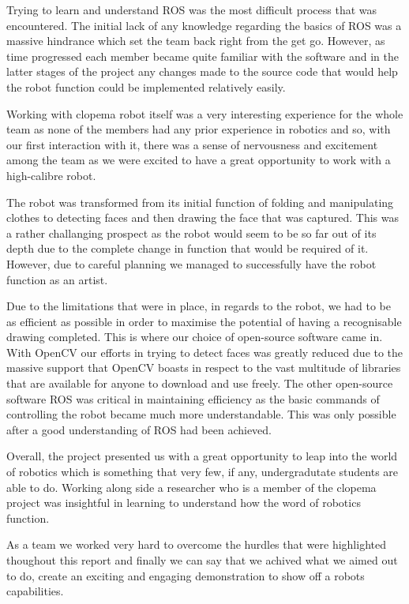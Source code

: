 \documentclass{l3proj}
\begin{document}
Trying to learn and understand ROS was the most difficult process that was encountered. The initial lack of any knowledge regarding the basics of ROS was a massive hindrance which set the team back right from the get go. However, as time progressed each member became quite familiar with the software and in the latter stages of the project any changes made to the source code that would help the robot function could be implemented relatively easily. 

Working with \acrshort{clopema} robot itself was a very interesting experience for the whole team as none of the members had any prior experience in robotics and so, with our first interaction with it, there was a sense of nervousness and excitement among the team as we were excited to have a great opportunity to work with a high-calibre robot.

The robot was transformed from its initial function of folding and manipulating clothes to detecting faces and then drawing the face that was captured. This was a rather challanging prospect as the robot would seem to be so far out of its depth due to the complete change in function that would be required of it. However, due to careful planning we managed to successfully have the robot function as an artist.

Due to the limitations that were in place, in regards to the robot, we had to be as efficient as possible in order to maximise the potential of having a recognisable drawing completed. This is where our choice of open-source software came in. With OpenCV our efforts in trying to detect faces was greatly reduced due to the massive support that OpenCV boasts in respect to the vast multitude of libraries that are available for anyone to download and use freely. The other open-source software ROS was critical in maintaining efficiency as the basic commands of controlling the robot became much more understandable. This was only possible after a good understanding of ROS had been achieved.

Overall, the project presented us with a great opportunity to leap into the world of robotics which is something that very few, if any, undergradutate students are able to do. Working along side a researcher who is a member of the \acrshort{clopema} project was insightful in learning to understand how the word of robotics function.

As a team we worked very hard to overcome the hurdles that were highlighted thoughout this report and finally we can say that we achived what we aimed out to do, create an exciting and engaging demonstration to show off a robots capabilities.
\end{document}
